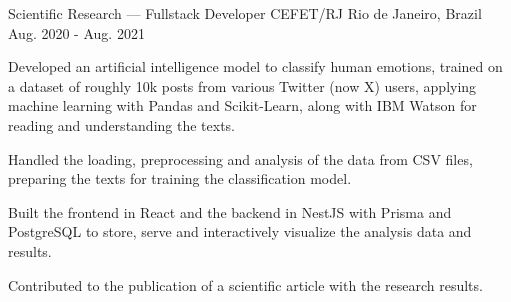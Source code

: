 \begin{cventries}
  \cventry
    {Scientific Research --- Fullstack Developer} %
    {CEFET/RJ} %
    {Rio de Janeiro, Brazil} %
    {Aug. 2020 - Aug. 2021} %
    {
      \begin{cvitems} %
        \item {Developed an artificial intelligence model to classify human emotions, trained on a dataset of roughly 10k posts from various Twitter (now X) users, applying machine learning with Pandas and Scikit-Learn, along with IBM Watson for reading and understanding the texts.}
        \item {Handled the loading, preprocessing and analysis of the data from CSV files, preparing the texts for training the classification model.}
        \item {Built the frontend in React and the backend in NestJS with Prisma and PostgreSQL to store, serve and interactively visualize the analysis data and results.}
        \item {Contributed to the publication of a scientific article with the research results.}
      \end{cvitems}
    }

\end{cventries}
